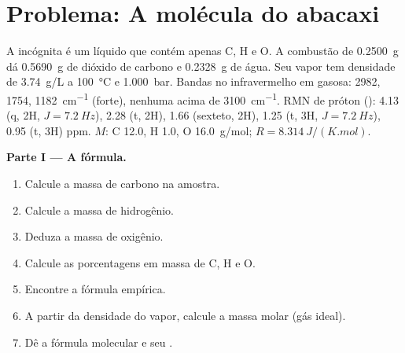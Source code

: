 \section{Problema: A molécula do abacaxi}

\begin{problem}
\label{pb:b1:structure-spectroscopy:1}
A incógnita é um líquido que contém apenas C, H e O. A combustão de
\qty{0.2500}{g} dá \qty{0.5690}{g} de dióxido de carbono e
\qty{0.2328}{g} de água. Seu vapor tem densidade de \qty{3.74}{g/L} a
\qty{100}{\celsius} e \qty{1.000}{bar}. Bandas no infravermelho em 
gasosa: 2982, 1754, \qty{1182}{cm^{-1}} (forte), nenhuma acima de
\qty{3100}{cm^{-1}}. RMN de próton (): 4.13 (q, 2H, $J = \qty{7.2}{Hz}$),
2.28 (t, 2H), 1.66 (sexteto, 2H), 1.25 (t, 3H, $J = \qty{7.2}{Hz}$), 0.95
(t, 3H) ppm. $M$: C 12.0, H 1.0, O \qty{16.0}{g/mol}; $R =
\qty{8.314}{J/(K.mol)}$.

\begin{center}
\end{center}

\medskip
\noindent\textbf{Parte I --- A fórmula.}
\begin{enumerate}
  \item Calcule a massa de carbono na amostra.
  \item Calcule a massa de hidrogênio.
  \item Deduza a massa de oxigênio.
  \item Calcule as porcentagens em massa de C, H e O.
  \item Encontre a fórmula empírica.
  \item A partir da densidade do vapor, calcule a massa molar (gás ideal).
  \item Dê a fórmula molecular e seu .
\end{enumerate}


\end{problem}
